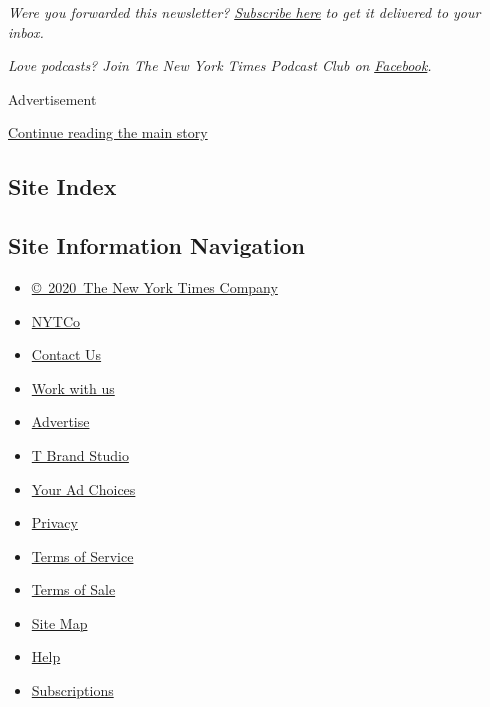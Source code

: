 \emph{Were you forwarded this newsletter?}
\href{https://www.nytimes3xbfgragh.onion/newsletters/the-daily?te=1\&nl=the-daily\&emc=edit_dy_20190627}{\emph{Subscribe
here}} \emph{to get it delivered to your inbox.}

\emph{Love podcasts? Join The New York Times Podcast Club on}
\href{https://www.facebookcorewwwi.onion/groups/nytpodcastclub}{\emph{Facebook}}\emph{.}

Advertisement

\protect\hyperlink{after-bottom}{Continue reading the main story}

\hypertarget{site-index}{%
\subsection{Site Index}\label{site-index}}

\hypertarget{site-information-navigation}{%
\subsection{Site Information
Navigation}\label{site-information-navigation}}

\begin{itemize}
\tightlist
\item
  \href{https://help.nytimes3xbfgragh.onion/hc/en-us/articles/115014792127-Copyright-notice}{©~2020~The
  New York Times Company}
\end{itemize}

\begin{itemize}
\tightlist
\item
  \href{https://www.nytco.com/}{NYTCo}
\item
  \href{https://help.nytimes3xbfgragh.onion/hc/en-us/articles/115015385887-Contact-Us}{Contact
  Us}
\item
  \href{https://www.nytco.com/careers/}{Work with us}
\item
  \href{https://nytmediakit.com/}{Advertise}
\item
  \href{http://www.tbrandstudio.com/}{T Brand Studio}
\item
  \href{https://www.nytimes3xbfgragh.onion/privacy/cookie-policy\#how-do-i-manage-trackers}{Your
  Ad Choices}
\item
  \href{https://www.nytimes3xbfgragh.onion/privacy}{Privacy}
\item
  \href{https://help.nytimes3xbfgragh.onion/hc/en-us/articles/115014893428-Terms-of-service}{Terms
  of Service}
\item
  \href{https://help.nytimes3xbfgragh.onion/hc/en-us/articles/115014893968-Terms-of-sale}{Terms
  of Sale}
\item
  \href{https://spiderbites.nytimes3xbfgragh.onion}{Site Map}
\item
  \href{https://help.nytimes3xbfgragh.onion/hc/en-us}{Help}
\item
  \href{https://www.nytimes3xbfgragh.onion/subscription?campaignId=37WXW}{Subscriptions}
\end{itemize}
